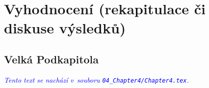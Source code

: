 ﻿\chapter[Vyhodnocení]{Vyhodnocení (rekapitulace či diskuse výsledků) \label{ch:kap4}}





\section{Velká Podkapitola}



\textcolor{blue}{\em Tento text se nachází v~souboru \texttt{04\_Chapter4/Chapter4.tex}.\/}
